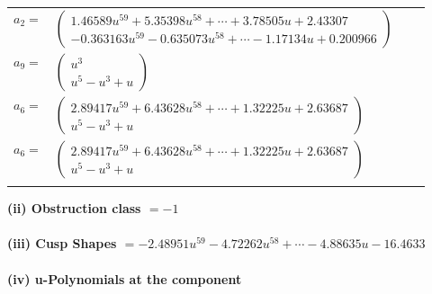 \documentclass[1p]{elsarticle_modified}
\theoremstyle{definition}
\begin{document}
\begin{tabular}{m{7pt} m{180pt} m{7pt} m{180pt} }
\flushright $a_{2}=$&$\begin{pmatrix}1.46589 u^{59}+5.35398 u^{58}+\cdots+3.78505 u+2.43307\\-0.363163 u^{59}-0.635073 u^{58}+\cdots-1.17134 u+0.200966\end{pmatrix}$ \\
\flushright $a_{9}=$&$\begin{pmatrix}u^3\\u^5- u^3+u\end{pmatrix}$ \\
\flushright $a_{6}=$&$\begin{pmatrix}2.89417 u^{59}+6.43628 u^{58}+\cdots+1.32225 u+2.63687\\u^5- u^3+u\end{pmatrix}$\\ \flushright $a_{6}=$&$\begin{pmatrix}2.89417 u^{59}+6.43628 u^{58}+\cdots+1.32225 u+2.63687\\u^5- u^3+u\end{pmatrix}$\\&\end{tabular}
\flushleft \textbf{(ii) Obstruction class $= -1$}\\~\\
\flushleft \textbf{(iii) Cusp Shapes $= -2.48951 u^{59}-4.72262 u^{58}+\cdots-4.88635 u-16.4633$}\\~\\
\newpage\renewcommand{\arraystretch}{1}
\flushleft \textbf{(iv) u-Polynomials at the component}\newline \\
\end{document}
